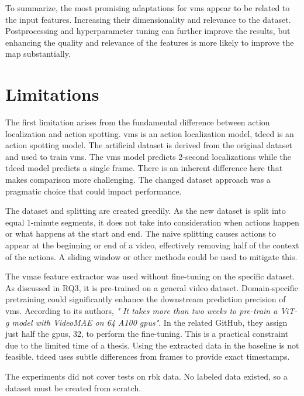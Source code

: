 To summarize, the most promising adaptations for \acrshort{vms} appear to be related to the input features. Increasing their dimensionality and relevance to the dataset. Postprocessing and hyperparameter tuning can further improve the results, but enhancing the quality and relevance of the features is more likely to improve the \acrshort{map} substantially.


\section{Limitations}


The first limitation arises from the fundamental difference between action localization and action spotting. \acrshort{vms} is an action localization model, \acrshort{tdeed} is an action spotting model. The artificial dataset is derived from the original dataset and used to train \acrshort{vms}. The \acrshort{vms} model predicts 2-second localizations while the \acrshort{tdeed} model predicts a single frame. There is an inherent difference here that makes comparison more challenging. The changed dataset approach was a pragmatic choice that could impact performance. 

The dataset and splitting are created greedily. As the new dataset is split into equal 1-minute segments, it does not take into consideration when actions happen or what happens at the start and end. The naive splitting causes actions to appear at the beginning or end of a video, effectively removing half of the context of the actions. A sliding window or other methods could be used to mitigate this. 

The \acrshort{vmae} feature extractor was used without fine-tuning on the specific dataset. As discussed in RQ3, it is pre-trained on a general video dataset. Domain-specific pretraining could significantly enhance the downstream prediction precision of \acrshort{vms}. According to its authors, \textit{" It takes more than two weeks to pre-train a ViT-g model with VideoMAE on 64 A100 \acrshort{gpu}s"}\cite{wang_videomae_2023}. In the related GitHub, they assign just half the \acrshort{gpu}s, 32, to perform the fine-tuning. This is a practical constraint due to the limited time of a thesis. Using the extracted data in the baseline is not feasible. \acrshort{tdeed} uses subtle differences from frames to provide exact timestamps. 

The experiments did not cover tests on \acrfull{rbk} data. No labeled data existed, so a dataset must be created from scratch. 

